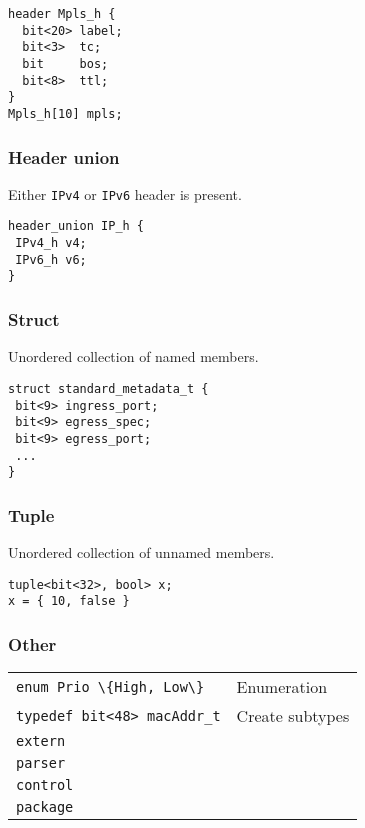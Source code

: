 \documentclass[a4paper, fontsize=8pt, landscape, DIV=1]{scrartcl}
\begin{document}
\begin{multicols*}{3}
\begin{lstlisting}[style=P4style]
header Mpls_h {
  bit<20> label;
  bit<3>  tc;
  bit     bos;
  bit<8>  ttl;
}
Mpls_h[10] mpls;
\end{lstlisting}

  \subsubsection{Header union}
Either \texttt{IPv4} or \texttt{IPv6} header is present.

\begin{lstlisting}[style=P4style]
header_union IP_h {
 IPv4_h v4;
 IPv6_h v6;
}
\end{lstlisting}


  \subsubsection{Struct}
  Unordered collection of named members.

\begin{lstlisting}[style=P4style]
struct standard_metadata_t {
 bit<9> ingress_port;
 bit<9> egress_spec;
 bit<9> egress_port;
 ...
}
\end{lstlisting}

  \subsubsection{Tuple}
  Unordered collection of unnamed members.

\begin{lstlisting}[style=P4style]
tuple<bit<32>, bool> x;
x = { 10, false }
\end{lstlisting}

  \subsubsection{Other}
  \begin{tabularx}{\linewidth}{ l X}
  \lstinline[style=P4style]!enum Prio \{High, Low\}! &
  Enumeration \\
  \lstinline[style=P4style]!typedef bit<48> macAddr_t! &
  Create subtypes \\
  \lstinline[style=P4style]!extern! &
  {}  \\
  \lstinline[style=P4style]!parser! &
  {}  \\
  \lstinline[style=P4style]!control! &
  {}  \\
  \lstinline[style=P4style]!package! &
  {}  \\
  \end{tabularx}


\end{multicols*}
\end{document}
